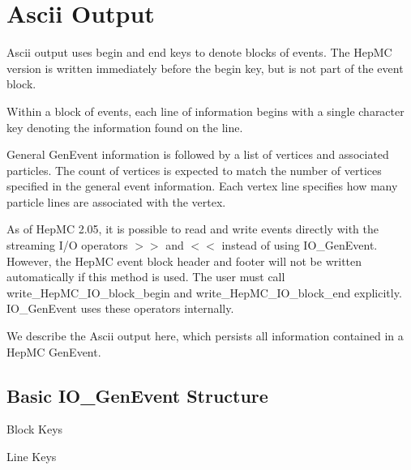 \documentclass[11pt,letterpaper]{article}
\begin{document}
%
%

\section{Ascii Output}
\label{iogenevent}

Ascii output uses begin and end keys to denote blocks of events.
The HepMC version is written immediately before the begin key, but 
is not part of the event block.

Within a block of events, each line of information begins with a 
single character key denoting the information found on the line.

General GenEvent information is followed by a list of vertices 
and associated particles.  The count of vertices is expected to match the 
number of vertices specified in the general event information.
Each vertex line specifies how many particle lines are associated 
with the vertex.

As of HepMC 2.05, it is possible to read and write events directly
with the streaming I/O operators $>>$ and $<<$ instead of using IO\_GenEvent.  
However, the HepMC event block header and footer will not be written 
automatically if this method is used.  The user must call 
write\_HepMC\_IO\_block\_begin and write\_HepMC\_IO\_block\_end explicitly.
IO\_GenEvent uses these operators internally.

We describe the Ascii output here, which persists all information
contained in a HepMC GenEvent.

%
%

\subsection{Basic IO\_GenEvent Structure}

\begin{myitemize}{Block Keys}
\end{myitemize}
\begin{myitemize}{Line Keys}
\end{myitemize}
\end{document}
